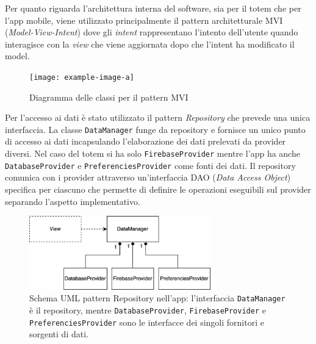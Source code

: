 Per quanto riguarda l'architettura interna del software, sia per il totem che per l'app mobile, viene utilizzato principalmente il pattern architetturale MVI (\textit{Model-View-Intent}) dove gli \textit{intent} rappresentano l'intento dell'utente quando interagisce con la \textit{view} che viene aggiornata dopo che l'intent ha modificato il model.
\begin{figure}
    \centering
    \texttt{[image: example-image-a]}
    \caption{Diagramma delle classi per il pattern MVI}
    \label{fig:mviPattern}
\end{figure}

Per l'accesso ai dati è stato utilizzato il pattern \textit{Repository} che prevede una unica interfaccia. La classe \texttt{DataManager} funge da repository e fornisce un unico punto di accesso ai dati incapsulando l'elaborazione dei dati prelevati da provider diversi.
Nel caso del totem si ha solo \texttt{FirebaseProvider} mentre l'app ha anche \texttt{DatabaseProvider} e \texttt{PreferenciesProvider} come fonti dei dati.
Il repository comunica con i provider attraverso un'interfaccia DAO (\textit{Data Access Object}) specifica per ciascuno che permette di definire le operazioni eseguibili sul provider separando l'aspetto implementativo.

\begin{figure}
    \centering
    \includegraphics[width=0.7\textwidth]{img/app/repository_pattern_scheme.png}
    \caption{Schema UML pattern Repository nell'app: l'interfaccia \texttt{DataManager} è il repository, mentre \texttt{DatabaseProvider}, \texttt{FirebaseProvider} e \texttt{PreferenciesProvider} sono le interfacce dei singoli fornitori e sorgenti di dati.}
    \label{fig:repoPattern}
\end{figure}

